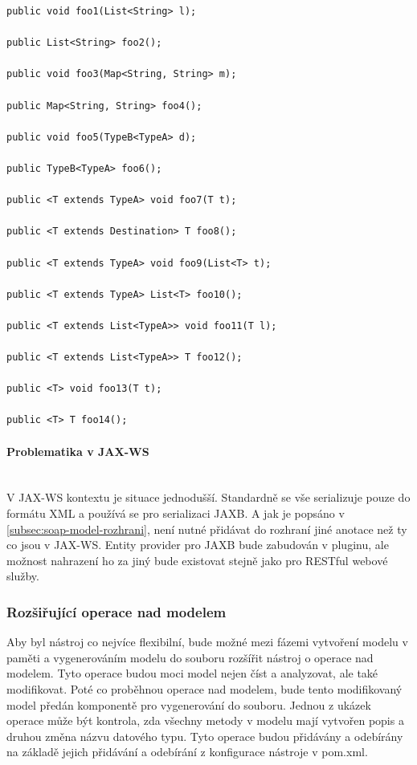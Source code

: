 \documentclass[11pt,twoside,a4paper]{book}
\begin{document}
\begin{lstlisting}[frame=single, caption={Příklad podporovaných signatur
resource metod}, label={lst:signatury-metod}]
public void foo1(List<String> l);

public List<String> foo2();

public void foo3(Map<String, String> m);

public Map<String, String> foo4();

public void foo5(TypeB<TypeA> d);

public TypeB<TypeA> foo6();

public <T extends TypeA> void foo7(T t);

public <T extends Destination> T foo8();

public <T extends TypeA> void foo9(List<T> t);

public <T extends TypeA> List<T> foo10();

public <T extends List<TypeA>> void foo11(T l);

public <T extends List<TypeA>> T foo12();

public <T> void foo13(T t);

public <T> T foo14();
\end{lstlisting}

\paragraph{Problematika v JAX-WS}
\mbox{}\\

V JAX-WS kontextu je situace jednodušší. Standardně se vše serializuje pouze do
formátu XML a používá se pro serializaci JAXB. A jak je popsáno v
\ref{subsec:soap-model-rozhrani}, není nutné přidávat do rozhraní jiné anotace
než ty co jsou v JAX-WS. Entity provider pro JAXB bude zabudován v pluginu, ale
možnost nahrazení ho za jiný bude existovat stejně jako pro RESTful webové
služby.

\subsubsection{Rozšiřující operace nad modelem}
\label{subsec:rozsirujici-operace-nad-modelem}

Aby byl nástroj co nejvíce flexibilní, bude možné mezi fázemi vytvoření modelu v
paměti a vygenerováním modelu do souboru rozšířit nástroj o operace nad modelem.
Tyto operace budou moci model nejen číst a analyzovat, ale také modifikovat.
Poté co proběhnou operace nad modelem, bude tento modifikovaný model předán
komponentě pro vygenerování do souboru.
Jednou z ukázek operace může být kontrola, zda všechny metody v modelu mají
vytvořen popis a druhou změna názvu datového typu. Tyto operace budou přidávány
a odebírány na základě jejich přidávání a odebírání z konfigurace nástroje v
pom.xml.
\end{document}
